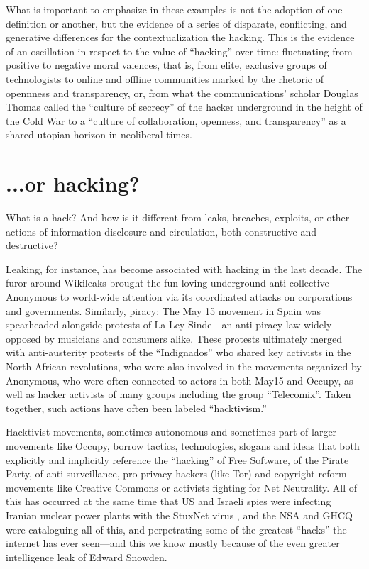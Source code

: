 \documentclass[10pt,letter,oneside]{scrartcl}
\begin{document}
What is important to emphasize in these examples is not the adoption of one
definition or another, but the evidence of a series of disparate, conflicting,
and generative differences for the contextualization the hacking. This is the
evidence of an oscillation in respect to the value of ``hacking'' over time:
fluctuating from positive to negative moral valences, that is, from elite,
exclusive groups of technologists to online and offline communities marked by
the rhetoric of opennness and transparency, or, from what the communications'
scholar Douglas Thomas called the ``culture of secrecy'' of the hacker
underground in the height of the Cold War to a ``culture of collaboration,
openness, and transparency'' as a shared utopian horizon in neoliberal times.

\section*{...or hacking?}

What is a hack?  And how is it different from leaks, breaches, exploits, or
other actions of information disclosure and circulation, both constructive and
destructive?

Leaking, for instance, has become associated with hacking in the last decade.
The furor around Wikileaks brought the fun-loving underground anti-collective
Anonymous to world-wide attention via its coordinated attacks on corporations
and governments.  Similarly, piracy: The May 15 movement in Spain was
spearheaded alongside protests of La Ley Sinde---an anti-piracy law widely
opposed by musicians and consumers alike.  These protests ultimately merged with
anti-austerity protests of the ``Indignados'' who shared key activists in the
North African revolutions, who were also involved in the movements organized by
Anonymous, who were often connected to actors in both May15 and Occupy, as well
as hacker activists of many groups including the group ``Telecomix''.  Taken
together, such actions have often been labeled ``hacktivism.''

Hacktivist movements, sometimes autonomous and sometimes part of larger
movements like Occupy, borrow tactics, technologies, slogans and ideas that both
explicitly and implicitly reference the ``hacking'' of Free Software, of the
Pirate Party, of anti-surveillance, pro-privacy hackers (like Tor) and copyright
reform movements like Creative Commons or activists fighting for Net
Neutrality. All of this has occurred at the same time that US and Israeli spies
were infecting Iranian nuclear power plants with the StuxNet virus
\parencite{zetter_countdown_2014}, and the NSA and GHCQ were cataloguing all of this,
and perpetrating some of the greatest ``hacks'' the internet has ever seen---and
this we know mostly because of the even greater intelligence leak of Edward
Snowden.
\end{document}
